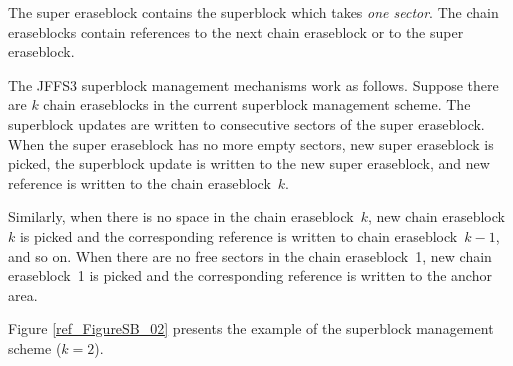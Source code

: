 \documentclass[12pt,a4paper,oneside,titlepage]{article}
\begin{document}
The super eraseblock contains the superblock which takes \emph{one sector}. The
chain eraseblocks contain references to the next chain eraseblock or to the
super eraseblock.

The JFFS3 superblock management mechanisms work as follows. Suppose there are
$k$ chain eraseblocks in the current superblock management scheme. The superblock
updates are written to consecutive sectors of the super eraseblock. When
the super eraseblock has no more empty sectors, new super eraseblock is picked,
the superblock update is written to the new super eraseblock, and new reference
is written to the chain eraseblock~$k$.

Similarly, when there is no space in the chain eraseblock~$k$, new chain
eraseblock~$k$ is picked and the corresponding reference is written to chain
eraseblock~$k-1$, and so on. When there are no free sectors in the chain
eraseblock~1, new chain eraseblock~1 is picked and the corresponding
reference is written to the anchor area.

Figure \ref{ref_FigureSB_02} presents the example of the superblock management
scheme ($k = 2$).
\end{document}
